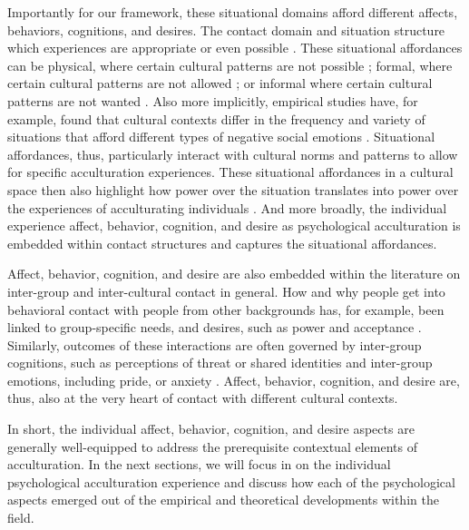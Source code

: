 \documentclass[man, 12pt, a4paper, mask]{apa7}
\begin{document}
Importantly for our framework, these situational domains afford different affects, behaviors, cognitions, and desires. The contact domain and situation structure which experiences are appropriate or even possible \citep[e.g.,][]{cantor1994}. These situational affordances can be physical, where certain cultural patterns are not possible \citep[e.g., localized ancestral worship][]{kawano2005}; formal, where certain cultural patterns are not allowed \citep[e.g., indigenous hunting practices][]{blaser2009}; or informal where certain cultural patterns are not wanted \citep[e.g., discrimination of black hair][]{robinson2011}. Also more implicitly, empirical studies have, for example, found that cultural contexts differ in the frequency and variety of situations that afford different types of negative social emotions \citep[][]{boiger2013}. Situational affordances, thus, particularly interact with cultural norms and patterns to allow for specific acculturation experiences. These situational affordances in a cultural space then also highlight how power over the situation translates into power over the experiences of acculturating individuals \citep[e.g.,][]{guinote2008}. And more broadly, the individual experience affect, behavior, cognition, and desire as psychological acculturation is embedded within contact structures and captures the situational affordances.

Affect, behavior, cognition, and desire are also embedded within the literature on inter-group and inter-cultural contact in general. How and why people get into behavioral contact with people from other backgrounds has, for example, been linked to group-specific needs, and desires, such as power and acceptance \citep[e.g.,][]{Hassler2021, Shnabel2008a}. Similarly, outcomes of these interactions are often governed by inter-group cognitions, such as perceptions of threat or shared identities \citep[e.g.,][]{Dovidio2017, Stephan2000a} and inter-group emotions, including pride, or anxiety \citep[e.g.,][]{Iyer2008, Stephan1992}. Affect, behavior, cognition, and desire are, thus, also at the very heart of contact with different cultural contexts.

In short, the individual affect, behavior, cognition, and desire aspects are generally well-equipped to address the prerequisite contextual elements of acculturation. In the next sections, we will focus in on the individual psychological acculturation experience and discuss how each of the psychological aspects emerged out of the empirical and theoretical developments within the field. 
\end{document}
